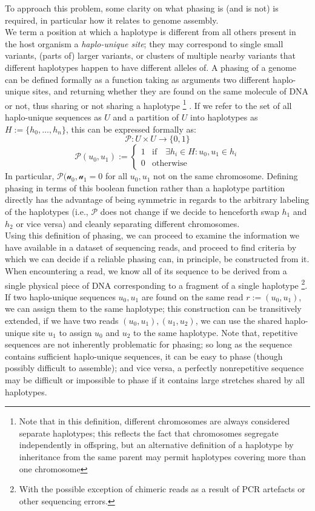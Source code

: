 To approach this problem, some clarity on what phasing is (and is not) is required, in particular how it relates to genome assembly.\\
We term a position at which a haplotype is different from all others present in the host organism a \emph{haplo-unique site}; they may correspond to single small variants, (parts of) larger variants, or clusters of multiple nearby variants that different haplotypes happen to have different alleles of.
A phasing of a genome can be defined formally as a function taking as arguments two different haplo-unique sites, and returning whether they are found on the same molecule of DNA or not, thus sharing or not sharing a haplotype
\footnote{Note that in this definition, different chromosomes are always considered separate haplotypes; this reflects the fact that chromosomes segregate independently in offspring, but an alternative definition of a haplotype by inheritance from the same parent may permit haplotypes covering more than one chromosome}
.
If we refer to the set of all haplo-unique sequences as $U$ and a partition of $U$ into haplotypes as $H := \{h_0, \dots, h_n\}$, this can be expressed formally as:
$$\mathcal{P}: U \times U \to \{0, 1\}$$
$$\mathcal{P}(u_0, u_1) := \begin{cases}1 & \textrm{if}\quad \exists h_i \in H: u_0, u_1 \in h_i \\ 0 & \textrm{otherwise} \end{cases}$$
In particular, $\mathcal{P(u_0, u_1} =0$ for all $u_0, u_1$ not on the same chromosome.
Defining phasing in terms of this boolean function rather than a haplotype partition directly has the advantage of being symmetric in regards to the arbitrary labeling of the haplotypes (i.e., $\mathcal{P}$ does not change if we decide to henceforth swap $h_1$ and $h_2$ or vice versa) and cleanly separating different chromosomes.
	\\
Using this definition of phasing, we can proceed to examine the information we have available in a dataset of sequencing reads, and proceed to find criteria by which we can decide if a reliable phasing can, in principle, be constructed from it.
When encountering a read, we know all of its sequence to be derived from a single physical piece of DNA corresponding to a fragment of a single haplotype
\footnote{With the possible exception of chimeric reads as a result of PCR artefacts or other sequencing errors.}.
If two haplo-unique sequences $u_0, u_1$ are found on the same read $r := (u_0, u_1)$, we can assign them to the same haplotype; this construction can be transitively extended, if we have two reads $(u_0, u_1), (u_1, u_2)$, we can use the shared haplo-unique site $u_1$ to assign $u_0$ and $u_2$ to the same haplotype.
Note that, repetitive sequences are not inherently problematic for phasing; so long as the sequence contains sufficient haplo-unique sequences, it can be easy to phase (though possibly difficult to assemble); and vice versa, a perfectly nonrepetitive sequence may be difficult or impossible to phase if it contains large stretches shared by all haplotypes.

